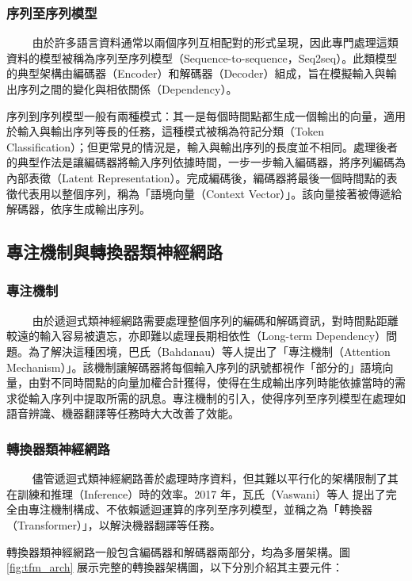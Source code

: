 \subsubsection{序列至序列模型}
　　
由於許多語言資料通常以兩個序列互相配對的形式呈現，因此專門處理這類資料的模型被稱為序列至序列模型（Sequence-to-sequence，Seq2seq）\cite{sutskever2014sequence}。此類模型的典型架構由編碼器（Encoder）和解碼器（Decoder）組成，旨在模擬輸入與輸出序列之間的變化與相依關係（Dependency）。

序列到序列模型一般有兩種模式：其一是每個時間點都生成一個輸出的向量，適用於輸入與輸出序列等長的任務，這種模式被稱為符記分類（Token Classification）；但更常見的情況是，輸入與輸出序列的長度並不相同。處理後者的典型作法是讓編碼器將輸入序列依據時間，一步一步輸入編碼器，將序列編碼為內部表徵（Latent Representation）。完成編碼後，編碼器將最後一個時間點的表徵代表用以整個序列，稱為「語境向量（Context Vector）」。該向量接著被傳遞給解碼器，依序生成輸出序列。
\subsection{專注機制與轉換器類神經網路}

\subsubsection{專注機制}
　　
由於遞迴式類神經網路需要處理整個序列的編碼和解碼資訊，對時間點距離較遠的輸入容易被遺忘，亦即難以處理長期相依性（Long-term Dependency）問題。為了解決這種困境，巴氏（Bahdanau）等人提出了「專注機制（Attention Mechanism）」\cite{bahdanau2014neural}。該機制讓解碼器將每個輸入序列的訊號都視作「部分的」語境向量，由對不同時間點的向量加權合計獲得，使得在生成輸出序列時能依據當時的需求從輸入序列中提取所需的訊息。專注機制的引入，使得序列至序列模型在處理如語音辨識、機器翻譯等任務時大大改善了效能。

\subsubsection{轉換器類神經網路}
　　
儘管遞迴式類神經網路善於處理時序資料，但其難以平行化的架構限制了其在訓練和推理（Inference）時的效率。2017 年，瓦氏（Vaswani）等人 \cite{vaswani2017attention} 提出了完全由專注機制構成、不依賴遞迴運算的序列至序列模型，並稱之為「轉換器（Transformer）」，以解決機器翻譯等任務。

轉換器類神經網路一般包含編碼器和解碼器兩部分，均為多層架構。圖 \ref{fig:tfm_arch} 展示完整的轉換器架構圖，以下分別介紹其主要元件：

